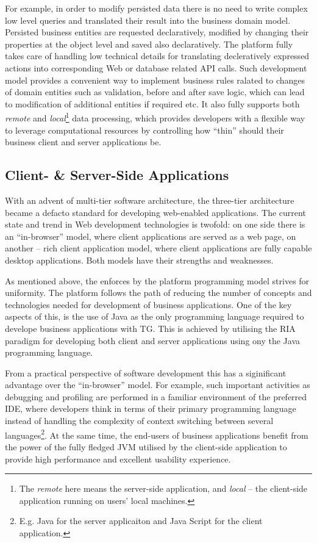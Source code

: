   For example, in order to modify persisted data there is no need to write complex low level queries and translated their result into the business domain model.
  Persisted business entities are requested declaratively, modified by changing their properties at the object level and saved also declaratively.
  The platform fully takes care of handling low technical details for translating decleratively expressed actions into corresponding Web or database related API calls.
  Such development model provides a convenient way to implement business rules ralated to changes of domain entities such as validation, before and after save logic, which can lead to modification of additional entities if required etc.
  It also fully supports both \emph{remote} and \emph{local}\footnote{The \emph{remote} here means the server-side application, and \emph{local} -- the client-side application running on users' local machines.} data processing, which provides developers with a flexible way to leverage computational resources by controlling how ``thin'' should their business client and server applications be.

  \subsection{Client- \& Server-Side Applications}
  With an advent of multi-tier software architecture, the three-tier architecture became a defacto standard for developing web-enabled applications.
  The current state and trend in Web development technologies is twofold: on one side there is an ``in-browser'' model, where client applications are served as a web page, on another -- rich client application model, where client applications are fully capable desktop applications.
  Both models have their strengths and weaknesses.

  As mentioned above, the enforces by the platform programming model strives for uniformity. 
  The platform follows the path of reducing the number of concepts and technologies needed for development of business applications.
  One of the key aspects of this, is the use of Java as the only programming language required to develope business applications with TG.
  This is achieved by utilising the RIA paradigm for developing both client and server applications using ony the Java programming language.
  
  From a practical perspective of software development this has a siginificant advantage over the ``in-browser'' model.  
  For example, such important activities as debugging and profiling are performed in a familiar environment of the preferred IDE, where developers think in terms of their primary programming language instead of handling the complexity of context switching between several languages\footnote{E.g. Java for the server applicaiton and Java Script for the client application.}.
  At the same time, the end-users of business applications benefit from the power of the fully fledged JVM utilised by the client-side application to provide high performance and excellent usability experience.
  
